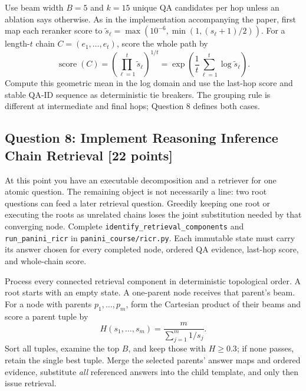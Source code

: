 \documentclass[11pt]{article}
\newcommand{\code}[1]{\texttt{#1}}
\newcommand{\question}[3]{%
  \subsection[Question #1: #2 (#3 points)]{Question #1: #2 \hfill [#3 points]}%
}
\begin{document}
Use beam width $B=5$ and $k=15$ unique QA candidates per hop unless an
ablation says otherwise. As in the implementation accompanying the paper,
first map each reranker score to
$\tilde{s}_\ell=\max(10^{-6},\min(1,(s_\ell+1)/2))$. For a length-$t$ chain
$C=(e_1,\ldots,e_t)$, score the whole path by
\begin{equation}
  \operatorname{score}(C)
  = \left(\prod_{\ell=1}^{t}\tilde{s}_\ell\right)^{1/t}
  = \exp\left(\frac{1}{t}\sum_{\ell=1}^{t}
    \log\tilde{s}_\ell\right).
\end{equation}
Compute this geometric mean in the log domain and use the last-hop score and
stable QA-ID sequence as deterministic tie breakers. The grouping rule is
different at intermediate and final hops; Question 8 defines both cases.

\question{8}{Implement Reasoning Inference Chain Retrieval}{22}

At this point you have an executable decomposition and a retriever for one
atomic question. The remaining object is not necessarily a line: two root
questions can feed a later retrieval question. Greedily keeping one root or
executing the roots as unrelated chains loses the joint substitution needed
by that converging node. Complete \code{identify\_retrieval\_components} and
\code{run\_panini\_ricr} in \code{panini\_course/ricr.py}. Each immutable
state must carry its answer chosen for every completed node, ordered QA
evidence, last-hop score, and whole-chain score.

Process every connected retrieval component in deterministic topological
order. A root starts with an empty state. A one-parent node receives that
parent's beam. For a node with parents $p_1,\ldots,p_m$, form the Cartesian
product of their beams and score a parent tuple by
\begin{equation}
 H(s_1,\ldots,s_m)=\frac{m}{\sum_{j=1}^{m}1/s_j}.
\end{equation}
Sort all tuples, examine the top $B$, and keep those with $H\geq0.3$; if none
passes, retain the single best tuple. Merge the selected parents' answer maps
and ordered evidence, substitute \emph{all} referenced answers into the child
template, and only then issue retrieval.
\end{document}
